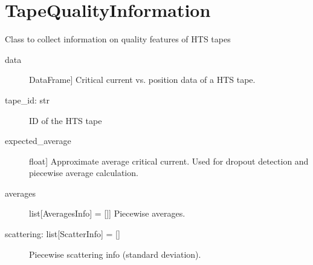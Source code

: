 \documentclass[letterpaper,10pt,english]{sphinxmanual}
\begin{document}
\section{TapeQualityInformation}
\label{\detokenize{generated/quality_assessment.tape_quality_information.TapeQualityInformation:tapequalityinformation}}\label{\detokenize{generated/quality_assessment.tape_quality_information.TapeQualityInformation::doc}}

\begin{fulllineitems}
\label{\detokenize{generated/quality_assessment.tape_quality_information.TapeQualityInformation:quality_assessment.tape_quality_information.TapeQualityInformation}}
\sphinxAtStartPar
Class to collect information on quality features of HTS tapes
\begin{description}
\item[{data}] \leavevmode{[}DataFrame{]}
\sphinxAtStartPar
Critical current vs. position data of a HTS tape.

\item[{tape\_id: str}] \leavevmode
\sphinxAtStartPar
ID of the HTS tape

\item[{expected\_average}] \leavevmode{[}float{]}
\sphinxAtStartPar
Approximate average critical current. Used for drop\sphinxhyphen{}out detection and
piecewise average calculation.

\item[{averages}] \leavevmode{[}list{[}AveragesInfo{]} = {[}{]}{]}
\sphinxAtStartPar
Piecewise averages.

\item[{scattering: list{[}ScatterInfo{]} = {[}{]}}] \leavevmode
\sphinxAtStartPar
Piecewise scattering info (standard deviation).


\end{description}
\end{fulllineitems}
\end{document}
